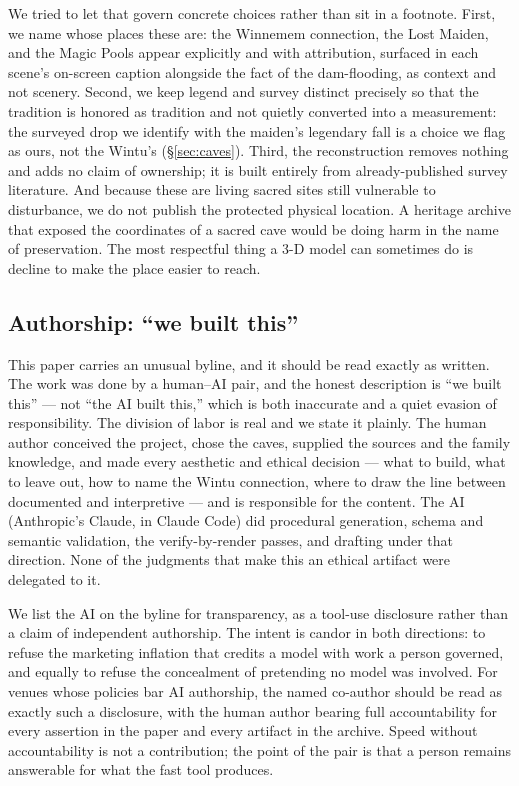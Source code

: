 \documentclass[11pt]{article}
\begin{document}
We tried to let that govern concrete choices rather than sit in a footnote.
First, we name whose places these are: the Winnemem connection, the Lost Maiden,
and the Magic Pools appear explicitly and with attribution, surfaced in each
scene's on-screen caption alongside the fact of the dam-flooding, as context and
not scenery. Second, we keep legend and survey distinct precisely so that the
tradition is honored as tradition and not quietly converted into a measurement:
the surveyed drop we identify with the maiden's legendary fall is a choice we
flag as ours, not the Wintu's (\S\ref{sec:caves}). Third, the reconstruction removes
nothing and adds no claim of ownership; it is built entirely from already-published
survey literature. And because these are living sacred sites still vulnerable to
disturbance, we do not publish the protected physical location. A heritage archive
that exposed the coordinates of a sacred cave would be doing harm in the name of
preservation. The most respectful thing a 3-D model can sometimes do is decline to
make the place easier to reach.

\subsection{Authorship: ``we built this''}

This paper carries an unusual byline, and it should be read exactly as written.
The work was done by a human--AI pair, and the honest description is ``we built
this'' --- not ``the AI built this,'' which is both inaccurate and a quiet
evasion of responsibility. The division of labor is real and we state it plainly.
The human author conceived the project, chose the caves, supplied the sources and
the family knowledge, and made every aesthetic and ethical decision --- what to
build, what to leave out, how to name the Wintu connection, where to draw the
line between documented and interpretive --- and is responsible for the content.
The AI (Anthropic's Claude, in Claude Code) did procedural generation, schema and
semantic validation, the verify-by-render passes, and drafting under that
direction. None of the judgments that make this an ethical artifact were
delegated to it.

We list the AI on the byline for transparency, as a tool-use disclosure rather
than a claim of independent authorship. The intent is candor in both directions:
to refuse the marketing inflation that credits a model with work a person
governed, and equally to refuse the concealment of pretending no model was
involved. For venues whose policies bar AI authorship, the named co-author should
be read as exactly such a disclosure, with the human author bearing full
accountability for every assertion in the paper and every artifact in the
archive. Speed without accountability is not a contribution; the point of the
pair is that a person remains answerable for what the fast tool produces.
\end{document}

